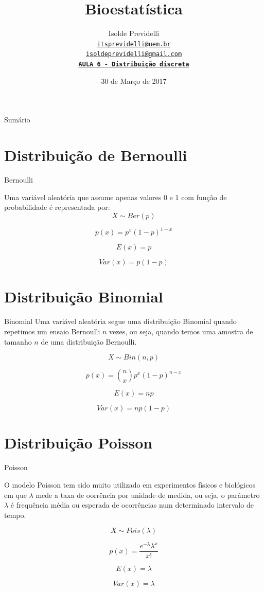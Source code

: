 \documentclass[9pt]{beamer}
\title[Bioestatística]{\bf Bioestatística\\
\vspace{.3\baselineskip}}
\subtitle[]{\bf}
\date{ 30 de Março de 2017}
\author[Isolde Previdelli]{
  Isolde Previdelli\\
  \href{itsprevidelli@uem.br}{{\tt itsprevidelli@uem.br \\
isoldeprevidelli@gmail.com \\ \vspace{8mm} \tt \textbf{\LARGE{AULA 6 -
    Distribuição discreta}}}}
}
\institute[PBE/UEM]{}
\begin{document}
{\pbebg
\begin{frame}
  \titlepage
\end{frame}}

\begin{frame}{Sumário}{}
\tableofcontents
\end{frame}

\section{Distribuição de Bernoulli}

\begin{frame}{Bernoulli}{}

Uma variável aleatória que assume apenas valores 0 e 1 com função de
probabilidade é representada por:
$$X \sim Ber(p)$$

$$
    p(x)=p^{x}(1-p)^{1-x}
$$

$$E(x)=p$$

$$Var(x)=p(1-p)$$

\end{frame}


\section{Distribuição Binomial}
\begin{frame}{Binomial}{}
Uma variável aleatória segue uma distribuição Binomial quando repetimos
um ensaio Bernoulli $n$ vezes, ou seja, quando temos uma amostra de
tamanho $n$ de uma distribuição Bernoulli.

$$X \sim Bin(n,p)$$

$$
p(x)=\binom{n}{x}  p^{x}(1-p)^{n-x}
$$


$$E(x)=np$$

$$Var(x)=np(1-p)$$


\end{frame}

\section{Distribuição Poisson}
\begin{frame}{Poisson}{}

O modelo Poisson tem sido muito utilizado em experimentos físicos e
biológicos em que $\lambda$ mede a taxa de oorrência por unidade de
medida, ou seja, o parâmetro $\lambda$ é frequência média ou esperada de
ocorrências num determinado intervalo de tempo.

$$X \sim Pois(\lambda)$$

$$p(x)=\displaystyle\frac{e^{-\lambda}\lambda^{x}}{x!}$$

$$E(x)=\lambda$$

$$Var(x)=\lambda$$

\end{frame}
\end{document}
